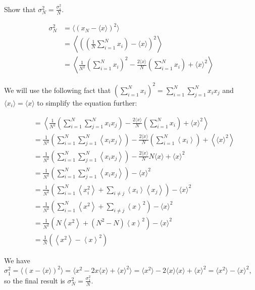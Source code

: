 \documentclass[12pt, a4paper]{article}
\newcounter{exa}
\begin{document}
\begin{texample}
Show that $\sigma_N^2=\frac{\sigma_1^2}{N}$.

\begin{align*}
\sigma_N^2 &= \langle (x_N - \langle x \rangle)^2 \rangle \\
&= \left\langle \left(\left( \frac{1}{N}\sum_{i=1}^N x_i \right) - \langle x \rangle\right)^2 \right\rangle \\
&= \left\langle \frac{1}{N^2}\left( \sum_{i=1}^N x_i \right)^2 - \frac{2 \langle x \rangle}{N} \left( \sum_{i=1}^N x_i \right) + \langle x \rangle^2 \right\rangle
\end{align*}

We will use the following fact that $\left( \sum_{i=1}^N x_i \right)^2 = \sum_{i=1}^N \sum_{j=1}^N x_i x_j$ and $\langle x_i \rangle = \langle x \rangle$ to simplify the equation further:

\begin{align*}
&= \left\langle \frac{1}{N^2}\left( \sum_{i=1}^N \sum_{j=1}^N x_i x_j \right) - \frac{2 \langle x \rangle}{N} \left( \sum_{i=1}^N x_i \right) + \langle x \rangle^2 \right\rangle \\
&= \frac{1}{N^2}\left( \sum_{i=1}^N \sum_{j=1}^N \left\langle x_i x_j \right\rangle \right) - \frac{2 \langle x \rangle}{N} \left( \sum_{i=1}^N \left\langle x_i \right\rangle \right) + \left\langle \langle x \rangle^2 \right\rangle \\
&= \frac{1}{N^2}\left( \sum_{i=1}^N \sum_{j=1}^N \left\langle x_i x_j \right\rangle \right) - \frac{2 \langle x \rangle}{N} N\langle x \rangle + \langle x \rangle^2 \\
&= \frac{1}{N^2}\left( \sum_{i=1}^N \sum_{j=1}^N \left\langle x_i x_j \right\rangle \right) - \langle x \rangle^2 \\
&= \frac{1}{N^2}\left( \sum_{i=1}^N \left\langle x_i^2 \right\rangle + \sum_{i \ne j} \left\langle x_i \right\rangle \left\langle x_j \right\rangle \right) - \langle x \rangle^2 \\
&= \frac{1}{N^2}\left( \sum_{i=1}^N \left\langle x^2 \right\rangle + \sum_{i \ne j} \left\langle x \right\rangle^2 \right) - \langle x \rangle^2 \\
&= \frac{1}{N^2}\left( N \left\langle x^2 \right\rangle + (N^2-N) \left\langle x \right\rangle^2 \right) - \langle x \rangle^2 \\
&= \frac{1}{N} (\left\langle x^2 \right\rangle -\left\langle x \right\rangle^2)
\end{align*}

We have $\sigma_1^2 = \langle (x- \langle x \rangle)^2 \rangle = \langle x^{2} - 2x\langle x \rangle + \langle x \rangle^2 \rangle = \langle x^2 \rangle - 2 \langle x \rangle \langle x \rangle + \langle x \rangle^2=\langle x^2 \rangle - \langle x \rangle^2$, so the final result is $\sigma_N^2=\frac{\sigma_1^2}{N}$.
\end{texample}
\end{document}
